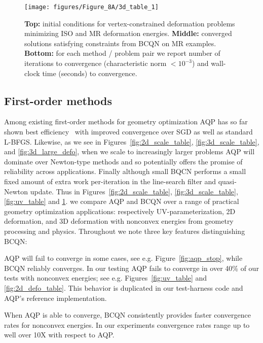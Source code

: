 \begin{figure}[h!]
\centering
\texttt{[image: figures/Figure\_8A/3d\_table\_1]}
\caption{  {\bf Top:}  initial
conditions for vertex-constrained deformation problems minimizing
ISO and MR deformation energies. {\bf Middle:} converged solutions
satisfying constraints from BCQN on MR examples. {\bf Bottom:} for
each method / problem pair we report number of iterations to
convergence (characteristic norm $< 10^{-3}$) and wall-clock time
(seconds) to convergence. }
\label{fig:3d_defo_table}
\end{figure}


\subsection{First-order methods}
\label{sec:1st}

Among existing first-order methods for geometry optimization AQP
has so far shown best efficiency~\cite{Kovalsky:2016:AQP} with
improved convergence over SGD as well as standard L-BFGS.
Likewise, as we see in Figures\ \ref{fig:2d_scale_table},
\ref{fig:3d_scale_table}, and \ref{fig:3d_large_defo}, when we scale
to increasingly larger problems AQP will dominate over Newton-type
methods and so potentially offers the promise of reliability across
applications. Finally although small BQCN performs a small fixed
amount of extra work per-iteration in the line-search filter and
quasi-Newton update. Thus in Figures\ \ref{fig:2d_scale_table},
\ref{fig:3d_scale_table}, \ref{fig:uv_table} and \ref{fig:3d_defo_table}.
we compare AQP and BCQN over a range of practical geometry optimization
applications: respectively UV-parameterization, 2D deformation, and
3D deformation with nonconvex energies from geometry processing and
physics.  Throughout we note three key features distinguishing BCQN:

AQP will fail to converge in some cases, see e.g. Figure\ \ref{fig:aqp_stop}, while BCQN reliably converges. In our testing AQP fails to converge in over 40\% of our tests with nonconvex energies; see e.g. Figures~\ref{fig:uv_table} and \ref{fig:2d_defo_table}.
This behavior is duplicated in our test-harness code and AQP's reference implementation.

 When AQP is able to converge, BCQN consistently provides faster convergence rates for nonconvex energies. In our experiments convergence rates range up to well over 10X with respect to AQP.


